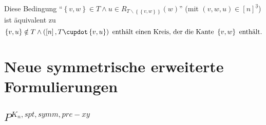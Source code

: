 \documentclass[10p,a4paper,BCOR = 12mm, DIV=15]{scrbook}
\begin{document}
{\begin{Bem}
Diese Bedingung "`$\left\{v, w\right\}\in T \wedge u\in R_{T\backslash \left\{\left\{v, w\right\}\right\}}\left(w\right)$"' (mit $\left(v, w, u\right) \in \left[n\right]^{\underline{3}}$) ist äquivalent zu
\begin{displaymath}
\left\{v, u\right\}\notin T\wedge\left(\left[n\right], T \cupdot \left\{v, u\right\}\right)\textnormal{ enthält einen Kreis, der die Kante }\left\{v, w\right\}\textnormal{ enthält}.
\end{displaymath} 
\end{Bem}

\chapter{Neue symmetrische erweiterte Formulierungen}

\section{$P^{K_n, spt, symm, pre-xy}$}

}
\end{document}
